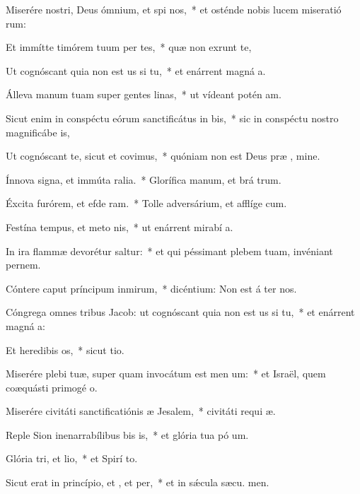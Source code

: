 \item Miserére nostri, Deus ómnium, et spi nos,~* et osténde nobis lucem miseratió rum:
\item Et immítte timórem tuum per tes,~* quæ non exrunt te,
\item Ut cognóscant quia non est us si tu,~* et enárrent magná a.
\item Álleva manum tuam super gentes linas,~* ut vídeant potén am.
\item Sicut enim in conspéctu eórum sanctificátus  in bis,~* sic in conspéctu nostro magnificábe  is,
\item Ut cognóscant te, sicut et  covimus,~* quóniam non est Deus præ , mine.
\item Ínnova signa, et immúta ralia.~* Glorífica manum, et brá trum.
\item Éxcita furórem, et efde ram.~* Tolle adversárium, et afflíge cum.
\item Festína tempus, et meto nis,~* ut enárrent mirabí a.
\item In ira flammæ devorétur  saltur:~* et qui péssimant plebem tuam, invéniant pernem.
\item Cóntere caput príncipum inmirum,~* dicéntium: Non est á ter nos.
\item Cóngrega omnes tribus Jacob: ut cognóscant quia non est us si tu,~* et enárrent magná a:
\item Et heredibis os,~* sicut  tio.
\item Miserére plebi tuæ, super quam invocátum est men um:~* et Israël, quem coæquásti primogé o.
\item Miserére civitáti sanctificatiónis æ Jesalem,~* civitáti requi æ.
\item Reple Sion inenarrabílibus bis is,~* et glória tua pó um.
\item Glória tri, et lio,~* et Spirí to.
\item Sicut erat in princípio, et , et per,~* et in sǽcula sæcu. men.
